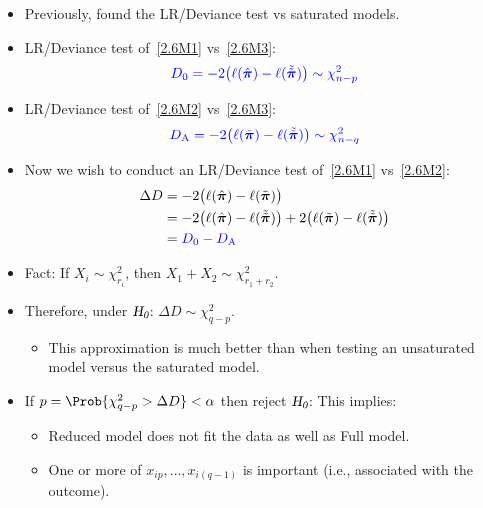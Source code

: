\documentclass[oneside]{book}\usepackage[]{graphicx}\usepackage[svgnames]{xcolor}
\newcommand{\HN}{\textsl{H}_{\textsl{0}}}%
\providecommand{\Vector}[1]{\bm{#1}}%
\begin{document}
\begin{itemize}
      \item Previously, found the LR/Deviance test vs saturated models.
      \item LR/Deviance test of~\ref{2.6M1} vs~\ref{2.6M3}:
            \[ \textcolor{Blue}{D_0=-2\bigl(\ell(\hat{\Vector{\pi}})-\ell(\tilde{\tilde{\Vector{\pi}}})\bigr)\sim \chi^2_{n-p}} \]
      \item LR/Deviance test of~\ref{2.6M2} vs~\ref{2.6M3}:
            \[ \textcolor{Blue}{D_\text{A}=-2\bigl(\ell(\tilde{\Vector{\pi}})-\ell(\tilde{\tilde{\Vector{\pi}}})\bigr)\sim \chi^2_{n-q}} \]
      \item Now we wish to conduct an LR/Deviance test of~\ref{2.6M1} vs~\ref{2.6M2}:
            \begin{align*}
                  \Delta D
                   & =-2\bigl(\ell(\hat{\Vector{\pi}})-\ell(\tilde{\Vector{\pi}})\bigr)                                                                                    \\
                   & =-2\bigl(\ell(\hat{\Vector{\pi}})-\ell(\tilde{\tilde{\Vector{\pi}}})\bigr)+2\bigl(\ell(\tilde{\Vector{\pi}})-\ell(\tilde{\tilde{\Vector{\pi}}})\bigr) \\
                   & =\textcolor{Blue}{D_0-D_\text{A}}
            \end{align*}
      \item Fact: If $ X_i \sim \chi^2_{r_i} $, then $ X_1+X_2 \sim \chi^2_{r_1+r_2} $.
      \item Therefore, under $ \HN $: $ \Delta D \sim \chi^2_{q-p} $.
            \begin{itemize}
                  \item This approximation is much better than when testing an unsaturated model versus
                        the saturated model.
            \end{itemize}
      \item If $ p=\Prob{\chi^2_{q-p}>\Delta D}<\alpha $ then reject $ \HN $: This implies:
            \begin{itemize}
                  \item Reduced model does not fit the data as well as Full model.
                  \item One or more of $ x_{ip},\ldots,x_{i(q-1)} $ is important (i.e., associated with the outcome).
            \end{itemize}
\end{itemize}
\end{document}
